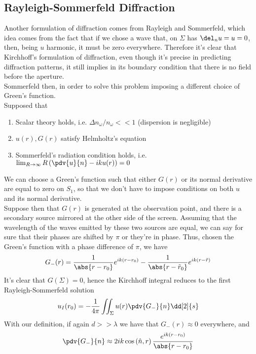 \documentclass[../electromagnetism.tex]{subfiles}
\begin{document}
\subsection{Rayleigh-Sommerfeld Diffraction}
Another formulation of diffraction comes from Rayleigh and Sommerfeld, which idea comes from the fact that if we chose a wave that, on $\Sigma$ has $\del_nu=u=0$, then, being $u$ harmonic, it must be zero everywhere. Therefore it's clear that Kirchhoff's formulation of diffraction, even though it's precise in predicting diffraction patterns, it still implies in its boundary condition that there is no field before the aperture.\\
Sommerfeld then, in order to solve this problem imposing a different choice of Green's function.\\
Supposed that
\begin{enumerate}
\item Scalar theory holds, i.e. $\Delta n_\omega/n_\omega<<1$ (dispersion is negligible)
\item $u(r),G(r)$ satisfy Helmholtz's equation
\item Sommerfeld's radiation condition holds, i.e. $\lim_{R\to\infty}R\left( \pdv{u}{n}-iku(r) \right)=0$
\end{enumerate}
We can choose a Green's function such that either $G(r)$ or its normal derivative are equal to zero on $S_1$, so that we don't have to impose conditions on both $u$ and its normal derivative.\\
Suppose then that $G(r)$ is generated at the observation point, and there is a secondary source mirrored at the other side of the screen. Assuming that the wavelength of the waves emitted by these two sources are equal, we can say for sure that their phases are shifted by $\pi$ or they're in phase. Thus, chosen the Green's function with a phase difference of $\pi$, we have
\begin{equation}
	G_{-}(r)=\frac{1}{\abs{r-r_0}}e^{ik(r-r_0)}-\frac{1}{\abs{r-\tilde{r}_0}}e^{ik(r-\tilde{r})}
	\label{eq:gminus.rsdiff}
\end{equation}
It's clear that $G(\Sigma)=0$, hence the Kirchhoff integral reduces to the first Rayleigh-Sommerfeld solution
\begin{equation}
	u_I(r_0)=-\frac{1}{4\pi}\iint_{\Sigma}u(r)\pdv{G_{-}}{n}\dd[2]{s}
	\label{eq:irs.rsdiff}
\end{equation}
With our definition, if again $d>>\lambda$ we have that $G_-(r)\approx0$ everywhere, and
\begin{equation}
	\pdv{G_-}{n}\approx2ik\cos\left( \hat{n},r \right)\frac{e^{ik(r-r_0)}}{\abs{r-r_0}}
	\label{eq:gnorm-.rsdiff}
\end{equation}
\end{document}
